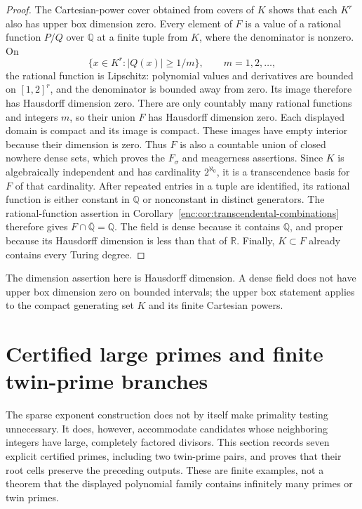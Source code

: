 \documentclass[11pt,a4paper]{article}
\theoremstyle{definition}
\theoremstyle{remark}
\numberwithin{equation}{section}
\begin{document}
\begin{proof}
The Cartesian-power cover obtained from covers of $K$ shows that each
$K^r$ also has upper box dimension zero.  Every element of $F$ is a value
of a rational function $P/Q$ over $\mathbb Q$ at a finite tuple from $K$,
where the denominator is nonzero.  On
\[
 \{x\in K^r:|Q(x)|\ge1/m\},\qquad m=1,2,\ldots,
\]
the rational function is Lipschitz: polynomial values and derivatives
are bounded on $[1,2]^r$, and the denominator is bounded away from zero.
Its image therefore has Hausdorff dimension zero.  There are only
countably many rational functions and integers $m$, so their union $F$
has Hausdorff dimension zero. Each displayed domain is compact and its
image is compact. These images have empty interior because their dimension
is zero. Thus $F$ is also a countable union of closed nowhere dense sets,
which proves the $F_\sigma$ and meagerness assertions.  Since $K$ is algebraically independent
and has cardinality $2^{\aleph_0}$, it is a transcendence basis for $F$
of that cardinality.  After repeated entries in a tuple are identified, its rational function
is either constant in $\mathbb Q$ or nonconstant in distinct generators.
The rational-function assertion in
Corollary~\ref{enc:cor:transcendental-combinations} therefore gives
$F\cap\overline{\mathbb Q}=\mathbb Q$.  The field is dense because it
contains $\mathbb Q$, and proper because its Hausdorff dimension is less
than that of $\mathbb R$.  Finally, $K\subset F$ already contains every
Turing degree.
\end{proof}

The dimension assertion here is Hausdorff dimension.  A dense field does
not have upper box dimension zero on bounded intervals; the upper box
statement applies to the compact generating set $K$ and its finite
Cartesian powers.


\section{Certified large primes and finite twin-prime branches}
\label{enc:sec:certificates}

The sparse exponent construction does not by itself make primality testing
unnecessary.  It does, however, accommodate candidates whose neighboring
integers have large, completely factored divisors.  This section records
seven explicit certified primes, including two twin-prime pairs, and proves
that their root cells preserve the preceding outputs.  These are finite
examples, not a theorem that the displayed polynomial family contains
infinitely many primes or twin primes.
\end{document}
